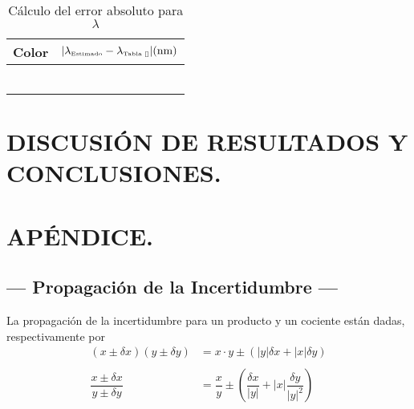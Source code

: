 \documentclass[12pt,a4paper]{article}
\begin{document}
 
 	\begin{table}[!htb]
 		\centering
 		\caption{Cálculo del error absoluto para $ \lambda $}
 		\begin{tabular}{|l|c|}
 			\hline
 			Color & $ |\lambda_{\tiny\mbox{Estimado}}-\lambda_{\tiny\mbox{Tabla \ref{}}}| (\mbox{nm})$ \\
 			\hline
 			\cellcolor{violet!40     }{Violeta   } & \cellcolor{violet!25     }{$ 22.5644 $}  \\ \hline
 			\cellcolor{blue!40       }{Azul      } & \cellcolor{blue!25       }{$ 29.5073 $}  \\ \hline
 			\cellcolor{ForestGreen!40}{Verde     } & \cellcolor{ForestGreen!25}{$ 21.9838 $}  \\ \hline
 			\cellcolor{yellow!40     }{Amarillo  } & \cellcolor{yellow!25     }{$ 52.3416 $}  \\ \hline
 			\cellcolor{orange!40     }{Anaranjado} & \cellcolor{orange!25     }{$ 53.0821 $}  \\ \hline
 			\cellcolor{red!40        }{Rojo      } & \cellcolor{red!25        }{$ 18.0927 $}  \\ \hline
 		\end{tabular}
 		\label{tab:6.1}
 	\end{table}
	  
	 \newpage 





\section{DISCUSIÓN DE RESULTADOS Y CONCLUSIONES.} %

% 
% 

\section{APÉNDICE.} %

	\subsection{--- Propagación de la Incertidumbre ---}
	 
	 La propagación de la incertidumbre para un producto y un cociente están dadas, respectivamente por
	 \begin{align*}
	 	(x\pm\delta x)(y\pm\delta y)&=x\cdot y\pm\left(|y|\delta x+|x|\delta y \right)\\\\
	 	\dfrac{x\pm\delta x}{y\pm\delta y}&=\dfrac{x}{y}\pm\left(\dfrac{\delta x}{|y|}+|x|\dfrac{\delta y}{|y|^2}\right)
	 \end{align*}
 
\end{document}
